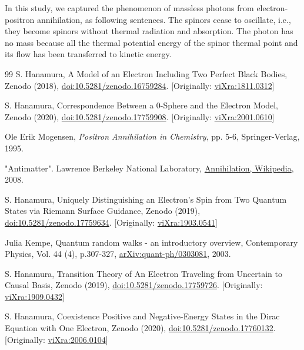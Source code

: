 \documentclass[%
 reprint,
 amsmath,amssymb,
 aps,
]{revtex4-1}
\numberwithin{equation}{section}%
\begin{document}
In this study, we captured the phenomenon of massless photons from electron-positron annihilation, as following sentences. The spinors cease to oscillate, i.e., they become spinors without thermal radiation and absorption. The photon has no mass because all the thermal potential energy of the spinor thermal point and its flow has been transferred to kinetic energy.


\begin{thebibliography}{99}
     S. Hanamura, A Model of an Electron Including Two Perfect Black Bodies, Zenodo (2018), \href{https://doi.org/10.5281/zenodo.16759284}{doi:10.5281/zenodo.16759284}. [Originally: \href{http://vixra.org/abs/1811.0312}{viXra:1811.0312}]
    
     S. Hanamura, Correspondence Between a 0-Sphere and the Electron Model, Zenodo (2020), \href{https://doi.org/10.5281/zenodo.17759908}{doi:10.5281/zenodo.17759908}. [Originally: \href{https://vixra.org/abs/2001.0610}{viXra:2001.0610}]
    
     Ole Erik Mogensen, \textit{Positron Annihilation in Chemistry}, pp. 5-6, Springer-Verlag, 1995.
    
     "Antimatter". Lawrence Berkeley National Laboratory,  \href{https://en.wikipedia.org/wiki/Annihilation#cite_note-Particleadventure.org-2}{Annihilation, Wikipedia}, 2008.
    
     S. Hanamura, Uniquely Distinguishing an Electron's Spin from Two Quantum States via Riemann Surface Guidance, Zenodo (2019), \href{https://doi.org/10.5281/zenodo.17759634}{doi:10.5281/zenodo.17759634}. [Originally: \href{https://vixra.org/abs/1903.0541}{viXra:1903.0541}]
    
     Julia Kempe, Quantum random walks - an introductory overview, Contemporary Physics, Vol. 44 (4), p.307-327, \href{https://arxiv.org/pdf/quant-ph/0303081.pdf}{arXiv:quant-ph/0303081}, 2003.
    
     S. Hanamura, Transition Theory of An Electron Traveling from Uncertain to Causal Basis, Zenodo (2019), \href{https://doi.org/10.5281/zenodo.17759726}{doi:10.5281/zenodo.17759726}. [Originally: \href{https://vixra.org/abs/1909.0432}{viXra:1909.0432}]
    
     S. Hanamura, Coexistence Positive and Negative-Energy States in the Dirac Equation with One Electron, Zenodo (2020), \href{https://doi.org/10.5281/zenodo.17760132}{doi:10.5281/zenodo.17760132}. [Originally: \href{https://vixra.org/abs/2006.0104}{viXra:2006.0104}]
    
\end{thebibliography}


\end{document}

